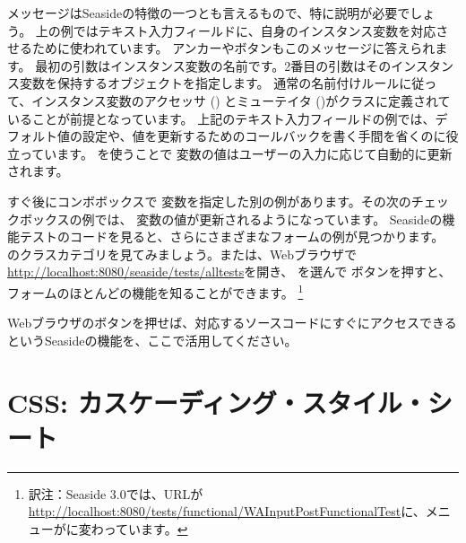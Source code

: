 \documentclass[a4paper,10pt,twoside]{book}
\begin{document}
メッセージはSeasideの特徴の一つとも言えるもので、特に説明が必要でしょう。
上の例ではテキスト入力フィールドに、自身のインスタンス変数を対応させるために使われています。
アンカーやボタンもこのメッセージに答えられます。
最初の引数はインスタンス変数の名前です。2番目の引数はそのインスタンス変数を保持するオブジェクトを指定します。
通常の名前付けルールに従って、インスタンス変数のアクセッサ () とミューテイタ ()がクラスに定義されていることが前提となっています。
上記のテキスト入力フィールドの例では、デフォルト値の設定や、値を更新するためのコールバックを書く手間を省くのに役立っています。
を使うことで  変数の値はユーザーの入力に応じて自動的に更新されます。

すぐ後にコンボボックスで 変数を指定した別の例があります。その次のチェックボックスの例では、  変数の値が更新されるようになっています。
Seasideの機能テストのコードを見ると、さらにさまざまなフォームの例が見つかります。
のクラスカテゴリを見てみましょう。または、Webブラウザで\url{http://localhost:8080/seaside/tests/alltests}を開き、
 を選んで  ボタンを押すと、フォームのほとんどの機能を知ることができます。
\footnote{訳注：Seaside 3.0では、URLが\url{http://localhost:8080/tests/functional/WAInputPostFunctionalTest}に、メニューがに変わっています。}

Webブラウザのボタンを押せば、対応するソースコードにすぐにアクセスできるというSeasideの機能を、ここで活用してください。

\section{CSS: カスケーディング・スタイル・シート}

\end{document}
